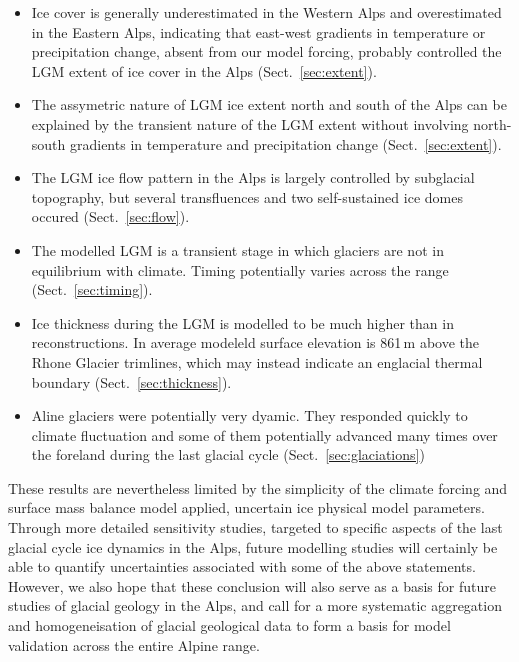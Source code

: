 \documentclass[tc, manuscript]{copernicus}
\begin{document}
    \begin{itemize}
      \item Ice cover is generally underestimated in the Western Alps and
            overestimated in the Eastern Alps, indicating that east-west
            gradients in temperature or precipitation change, absent from our
            model forcing, probably controlled the LGM extent of ice cover in
            the Alps (Sect.~\ref{sec:extent}).
      \item The assymetric nature of LGM ice extent north and south of the Alps
            can be explained by the transient nature of the LGM extent without
            involving north-south gradients in temperature and precipitation
            change (Sect.~\ref{sec:extent}).
      \item The LGM ice flow pattern in the Alps is largely controlled by
            subglacial topography, but several transfluences and two
            self-sustained ice domes occured (Sect.~\ref{sec:flow}).
      \item The modelled LGM is a transient stage in which glaciers are not in
            equilibrium with climate. Timing potentially varies across the
            range (Sect.~\ref{sec:timing}).
      \item Ice thickness during the LGM is modelled to be much higher than in
            reconstructions. In average modeleld surface elevation is 861\,m
            above the Rhone Glacier trimlines, which may instead indicate an
            englacial thermal boundary (Sect.~\ref{sec:thickness}).
      \item Aline glaciers were potentially very dyamic. They responded quickly
            to climate fluctuation and some of them potentially advanced many
            times over the foreland during the last glacial cycle
            (Sect.~\ref{sec:glaciations})
    \end{itemize}

    These results are nevertheless limited by the simplicity of the climate
    forcing and surface mass balance model applied, uncertain ice physical
    model parameters. Through more detailed sensitivity studies, targeted to
    specific aspects of the last glacial cycle ice dynamics in the Alps, future
    modelling studies will certainly be able to quantify uncertainties
    associated with some of the above statements. However, we also hope that
    these conclusion will also serve as a basis for future studies of glacial
    geology in the Alps, and call for a more systematic aggregation and
    homogeneisation of glacial geological data to form a basis for model
    validation across the entire Alpine range.
\end{document}

